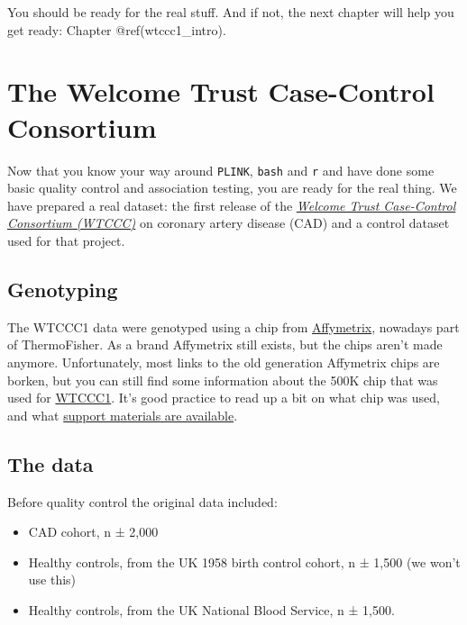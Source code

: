 \documentclass[
]{book}
\newcommand{\passthrough}[1]{#1}
\providecommand{\tightlist}{%
  \setlength{\itemsep}{0pt}\setlength{\parskip}{0pt}}
\begin{document}
You should be ready for the real stuff. And if not, the next chapter will help you get ready: Chapter @ref(wtccc1\_intro).

\hypertarget{wtccc1_intro}{%
\chapter{The Welcome Trust Case-Control Consortium}\label{wtccc1_intro}}

Now that you know your way around \passthrough{\lstinline!PLINK!}, \passthrough{\lstinline!bash!} and \passthrough{\lstinline!r!} and have done some basic quality control and association testing, you are ready for the real thing. We have prepared a real dataset: the first release of the \href{https://www.wtccc.org.uk/ccc1/overview.html}{\emph{Welcome Trust Case-Control Consortium (WTCCC)}} on coronary artery disease (CAD) and a control dataset used for that project.

\hypertarget{genotyping}{%
\section{Genotyping}\label{genotyping}}

The WTCCC1 data were genotyped using a chip from \href{https://www.thermofisher.com/us/en/home/life-science/microarray-analysis/affymetrix.html?category=34000\&categoryIdClicked=34000\&rootCategoryId=34000\&navMode=34000\&aId=productsNav}{Affymetrix}, nowadays part of ThermoFisher. As a brand Affymetrix still exists, but the chips aren't made anymore. Unfortunately, most links to the old generation Affymetrix chips are borken, but you can still find some information about the 500K chip that was used for \href{https://tools.thermofisher.com/content/sfs/brochures/whole_genome_assoc_500k_jsmith.pdf}{WTCCC1}. It's good practice to read up a bit on what chip was used, and what \href{https://www.thermofisher.com/us/en/home/life-science/microarray-analysis/microarray-data-analysis.html}{support materials are available}.

\hypertarget{the-data}{%
\section{The data}\label{the-data}}

Before quality control the original data included:

\begin{itemize}
\tightlist
\item
  CAD cohort, n ± 2,000
\item
  Healthy controls, from the UK 1958 birth control cohort, n ± 1,500 (we won't use this)
\item
  Healthy controls, from the UK National Blood Service, n ± 1,500.
\end{itemize}
\end{document}
